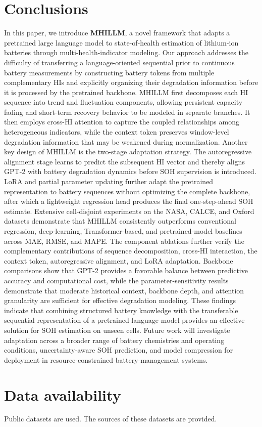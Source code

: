 \documentclass[preprint,12pt]{elsarticle}
\begin{document}
\section{Conclusions}
In this paper, we introduce \textbf{MHILLM}, a novel framework that adapts a pretrained large language model to state-of-health estimation of lithium-ion batteries through multi-health-indicator modeling. Our approach addresses the difficulty of transferring a language-oriented sequential prior to continuous battery measurements by constructing battery tokens from multiple complementary HIs and explicitly organizing their degradation information before it is processed by the pretrained backbone. MHILLM first decomposes each HI sequence into trend and fluctuation components, allowing persistent capacity fading and short-term recovery behavior to be modeled in separate branches. It then employs cross-HI attention to capture the coupled relationships among heterogeneous indicators, while the context token preserves window-level degradation information that may be weakened during normalization. Another key design of MHILLM is the two-stage adaptation strategy. The autoregressive alignment stage learns to predict the subsequent HI vector and thereby aligns GPT-2 with battery degradation dynamics before SOH supervision is introduced. LoRA and partial parameter updating further adapt the pretrained representation to battery sequences without optimizing the complete backbone, after which a lightweight regression head produces the final one-step-ahead SOH estimate. Extensive cell-disjoint experiments on the NASA, CALCE, and Oxford datasets demonstrate that MHILLM consistently outperforms conventional regression, deep-learning, Transformer-based, and pretrained-model baselines across MAE, RMSE, and MAPE. The component ablations further verify the complementary contributions of sequence decomposition, cross-HI interaction, the context token, autoregressive alignment, and LoRA adaptation. Backbone comparisons show that GPT-2 provides a favorable balance between predictive accuracy and computational cost, while the parameter-sensitivity results demonstrate that moderate historical context, backbone depth, and attention granularity are sufficient for effective degradation modeling. These findings indicate that combining structured battery knowledge with the transferable sequential representation of a pretrained language model provides an effective solution for SOH estimation on unseen cells. Future work will investigate adaptation across a broader range of battery chemistries and operating conditions, uncertainty-aware SOH prediction, and model compression for deployment in resource-constrained battery-management systems.



\section*{Data availability}
Public datasets are used. The sources of these datasets are provided.

























\end{document}
